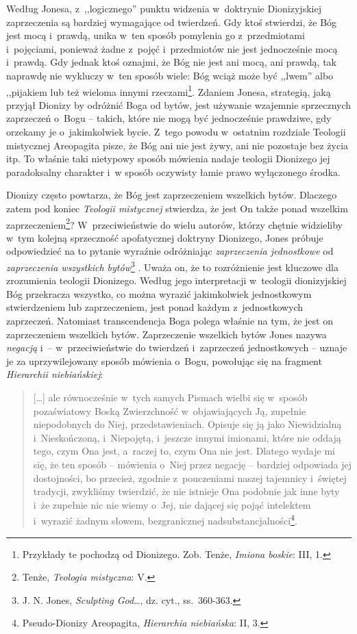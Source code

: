 Według Jonesa, z~,,logicznego'' punktu widzenia w~doktrynie Dionizyjskiej zaprzeczenia są bardziej wymagające od twierdzeń. Gdy ktoś stwierdzi, że Bóg jest mocą i~prawdą, unika w~ten sposób pomylenia go z~przedmiotami i~pojęciami, ponieważ żadne z~pojęć i~przedmiotów nie jest jednocześnie mocą i~prawdą. Gdy jednak ktoś oznajmi, że Bóg nie jest ani mocą, ani prawdą, tak naprawdę nie wykluczy w~ten sposób wiele: Bóg wciąż może być ,,lwem'' albo ,,pijakiem lub też wieloma innymi rzeczami\footnote{Przykłady te pochodzą od Dionizego. Zob. Tenże, \textit{Imiona boskie}: III, 1.}. Zdaniem Jonesa, strategią, jaką przyjął Dionizy by odróżnić Boga od bytów, jest używanie wzajemnie sprzecznych zaprzeczeń o~Bogu -- takich, które nie mogą być jednocześnie prawdziwe, gdy orzekamy je o~jakimkolwiek bycie. Z~tego powodu w~ostatnim rozdziale Teologii mistycznej Areopagita pisze, że Bóg ani nie jest żywy, ani nie pozostaje bez życia itp. To właśnie taki nietypowy sposób mówienia nadaje teologii Dionizego jej paradoksalny charakter i~w sposób oczywisty łamie prawo wyłączonego środka.

Dionizy często powtarza, że Bóg jest zaprzeczeniem wszelkich bytów. Dlaczego zatem pod koniec \textit{Teologii mistycznej} stwierdza, że jest On także ponad wszelkim zaprzeczeniem\footnote{Tenże, \textit{Teologia mistyczna}: V.}? W~przeciwieństwie do wielu autorów, którzy chętnie widzieliby w~tym kolejną sprzeczność apofatycznej doktryny Dionizego, Jones próbuje odpowiedzieć na to pytanie wyraźnie odróżniając \textit{zaprzeczenia jednostkowe} od \textit{zaprzeczenia wszystkich bytów}\footnote{J. N. Jones, \textit{Sculpting God}\ldots, dz. cyt., ss.~360-363.}
. Uważa on, że to rozróżnienie jest kluczowe dla zrozumienia teologii Dionizego. Według jego interpretacji w~teologii dionizyjskiej Bóg przekracza wszystko, co można wyrazić jakimkolwiek jednostkowym stwierdzeniem lub zaprzeczeniem, jest ponad każdym z~jednostkowych zaprzeczeń. Natomiast transcendencja Boga polega właśnie na tym, że jest on zaprzeczeniem wszelkich bytów. Zaprzeczenie wszelkich bytów Jones nazywa \textit{negacją} i~-- w~przeciwieństwie do twierdzeń i~zaprzeczeń jednostkowych -- uznaje je za uprzywilejowany sposób mówienia o~Bogu, powołując się na fragment \textit{Hierarchii niebiańskiej}:

\begin{quote}
[\ldots] ale równocześnie w~tych samych Pismach wielbi się w~sposób pozaświatowy Boską Zwierzchność w~objawiających Ją, zupełnie niepodobnych do Niej, przedstawieniach. Opisuje się ją jako Niewidzialną i~Nieskończoną, i~Niepojętą, i~jeszcze innymi imionami, które nie oddają tego, czym Ona jest, a~raczej to, czym Ona nie jest. Dlatego wydaje mi się, że ten sposób -- mówienia o~Niej przez negację -- bardziej odpowiada jej dostojności, bo przecież, zgodnie z~pouczeniami naszej tajemnicy i~świętej tradycji, zwykliśmy twierdzić, że nie istnieje Ona podobnie jak inne byty i~że zupełnie nic nie wiemy o~Jej, nie dającej się pojąć intelektem i~wyrazić żadnym słowem, bezgranicznej nadsubstancjalności\footnote{Pseudo-Dionizy Areopagita, \textit{Hierarchia niebiańska}: II, 3.}.
\end{quote}

